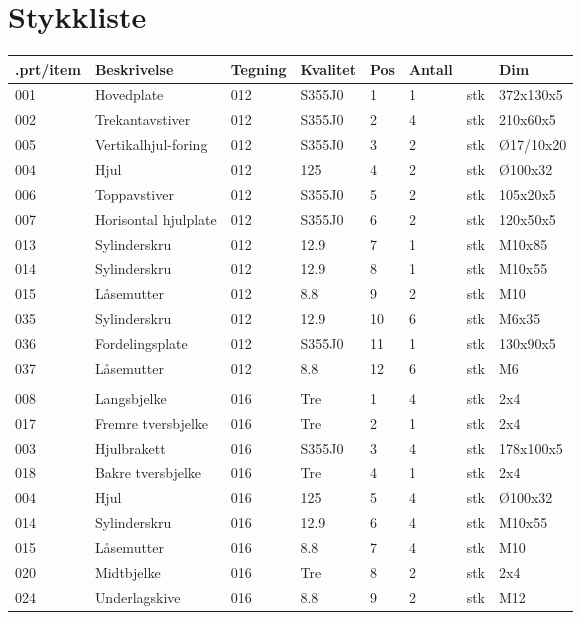 \chapter{Stykkliste}
\begin{tabular}{|l|l|l|l|l|l|l|l|}
\hline
.prt/item & Beskrivelse & Tegning & Kvalitet & Pos & Antall &  & Dim\\ \hline
001 & Hovedplate & 012 & S355J0 & 1 & 1 & stk & 372x130x5\\ \hline
002 & Trekantavstiver & 012 & S355J0 & 2 & 4 & stk & 210x60x5\\ \hline
005 & Vertikalhjul-foring & 012 & S355J0 & 3 & 2 & stk & Ø17/10x20\\ \hline
004 & Hjul & 012 & 125 & 4 & 2 & stk & Ø100x32\\ \hline
006 & Toppavstiver & 012 & S355J0 & 5 & 2 & stk & 105x20x5\\ \hline
007 & Horisontal hjulplate & 012 & S355J0 & 6 & 2 & stk & 120x50x5\\ \hline
013 & Sylinderskru & 012 & 12.9 & 7 & 1 & stk & M10x85\\ \hline
014 & Sylinderskru & 012 & 12.9 & 8 & 1 & stk & M10x55\\ \hline
015 & Låsemutter & 012 & 8.8 & 9 & 2 & stk & M10\\ \hline
035 & Sylinderskru & 012 & 12.9 & 10 & 6 & stk & M6x35\\ \hline
036 & Fordelingsplate & 012 & S355J0 & 11 & 1 & stk & 130x90x5\\ \hline
037 & Låsemutter & 012 & 8.8 & 12 & 6 & stk & M6\\ \hline
 &  &  &  &  &  &  & \\ \hline
008 & Langsbjelke & 016 & Tre & 1 & 4 & stk & 2x4\\ \hline
017 & Fremre tversbjelke & 016 & Tre & 2 & 1 & stk & 2x4\\ \hline
003 & Hjulbrakett & 016 & S355J0 & 3 & 4 & stk & 178x100x5\\ \hline
018 & Bakre tversbjelke & 016 & Tre & 4 & 1 & stk & 2x4\\ \hline
004 & Hjul & 016 & 125 & 5 & 4 & stk & Ø100x32\\ \hline
014 & Sylinderskru & 016 & 12.9 & 6 & 4 & stk & M10x55\\ \hline
015 & Låsemutter & 016 & 8.8 & 7 & 4 & stk & M10\\ \hline
020 & Midtbjelke & 016 & Tre & 8 & 2 & stk & 2x4\\ \hline
024 & Underlagskive & 016 & 8.8 & 9 & 2 & stk & M12\\ \hline

\end{tabular}
